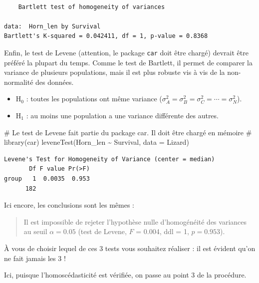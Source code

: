 \documentclass[
  a4paper,
  DIV=11,
  numbers=noendperiod,
  oneside]{scrreprt}
\newenvironment{Shaded}{}{}
\newcommand{\AttributeTok}[1]{\textcolor[rgb]{0.84,0.23,0.29}{#1}}
\newcommand{\CommentTok}[1]{\textcolor[rgb]{0.42,0.45,0.49}{#1}}
\newcommand{\FunctionTok}[1]{\textcolor[rgb]{0.44,0.26,0.76}{#1}}
\newcommand{\NormalTok}[1]{\textcolor[rgb]{0.14,0.16,0.18}{#1}}
\newcommand{\SpecialCharTok}[1]{\textcolor[rgb]{0.00,0.36,0.77}{#1}}
\providecommand{\tightlist}{%
  \setlength{\itemsep}{0pt}\setlength{\parskip}{0pt}}\usepackage{longtable,booktabs,array}
\begin{document}
\begin{verbatim}

    Bartlett test of homogeneity of variances

data:  Horn_len by Survival
Bartlett's K-squared = 0.042411, df = 1, p-value = 0.8368
\end{verbatim}

Enfin, le test de Levene (attention, le package \texttt{car} doit être
chargé) devrait être préféré la plupart du temps. Comme le test de
Bartlett, il permet de comparer la variance de plusieurs populations,
mais il est plus robuste vis à vis de la non-normalité des données.

\begin{itemize}
\tightlist
\item
  H\(_0\) : toutes les populations ont même variance
  (\(\sigma^2_A = \sigma^2_B = \sigma^2_C = \cdots = \sigma^2_N\)).
\item
  H\(_1\) : au moins une population a une variance différente des
  autres.
\end{itemize}

\begin{Shaded}
\begin{Highlighting}[]
\CommentTok{\# Le test de Levene fait partie du package car. Il doit être chargé en mémoire}
\CommentTok{\# library(car)}
\FunctionTok{leveneTest}\NormalTok{(Horn\_len }\SpecialCharTok{\textasciitilde{}}\NormalTok{ Survival, }\AttributeTok{data =}\NormalTok{ Lizard)}
\end{Highlighting}
\end{Shaded}

\begin{verbatim}
Levene's Test for Homogeneity of Variance (center = median)
       Df F value Pr(>F)
group   1  0.0035  0.953
      182               
\end{verbatim}

Ici encore, les conclusions sont les mêmes :

\begin{quote}
Il est impossible de rejeter l'hypothèse nulle d'homogénéité des
variances au seuil \(\alpha = 0.05\) (test de Levene, \(F\) = 0.004, ddl
= 1, \(p = 0.953\)).
\end{quote}

À vous de choisir lequel de ces 3 tests vous souhaitez réaliser : il est
évident qu'on ne fait jamais les 3 !

Ici, puisque l'homoscédasticité est vérifiée, on passe au point 3 de la
procédure.
\end{document}
